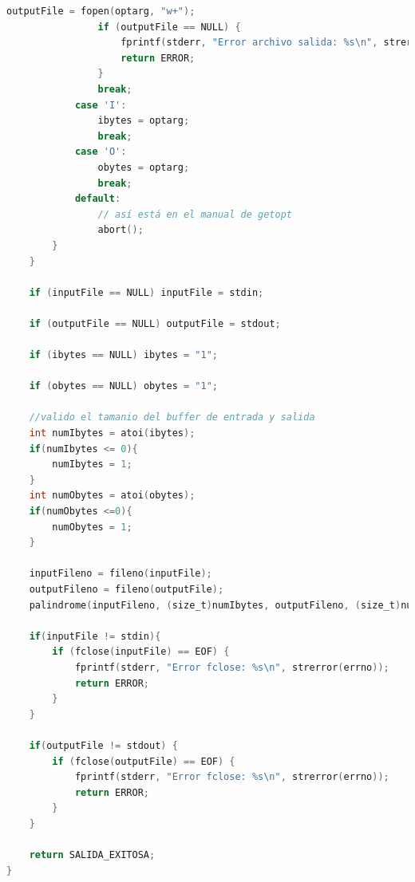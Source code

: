\documentclass[a4paper]{article}
\begin{document}
\begin{lstlisting}[language=C]
                outputFile = fopen(optarg, "w+");
                if (outputFile == NULL) {
				    fprintf(stderr, "Error archivo salida: %s\n", strerror(errno));
				    return ERROR;
                }
                break;
            case 'I':
                ibytes = optarg;
                break;
            case 'O':
                obytes = optarg;
                break;
            default:
                // así está en el manual de getopt
                abort();
        }
    }

    if (inputFile == NULL) inputFile = stdin;

    if (outputFile == NULL) outputFile = stdout;

    if (ibytes == NULL) ibytes = "1";

    if (obytes == NULL) obytes = "1";

    //valido el tamanio del buffer de entrada y salida
    int numIbytes = atoi(ibytes);
    if(numIbytes <= 0){
    	numIbytes = 1;
    }
    int numObytes = atoi(obytes);
    if(numObytes <=0){
    	numObytes = 1;
    }

    inputFileno = fileno(inputFile);
    outputFileno = fileno(outputFile);
    palindrome(inputFileno, (size_t)numIbytes, outputFileno, (size_t)numObytes);

    if(inputFile != stdin){
    	if (fclose(inputFile) == EOF) {
			fprintf(stderr, "Error fclose: %s\n", strerror(errno));
			return ERROR;
		}
	}

    if(outputFile != stdout) {
        if (fclose(outputFile) == EOF) {
    		fprintf(stderr, "Error fclose: %s\n", strerror(errno));
    		return ERROR;
    	}
    }

    return SALIDA_EXITOSA;
}
\end{lstlisting}
\end{document}
